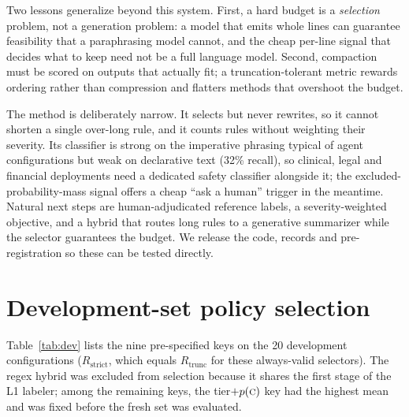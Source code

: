 \documentclass[11pt,a4paper]{article}
\newcommand{\Rt}{R_{\mathrm{trunc}}}
\newcommand{\Rs}{R_{\mathrm{strict}}}
\begin{document}
Two lessons generalize beyond this system. First, a hard budget is a \emph{selection} problem, not a generation problem: a model that emits whole lines can guarantee feasibility that a paraphrasing model cannot, and the cheap per-line signal that decides what to keep need not be a full language model. Second, compaction must be scored on outputs that actually fit; a truncation-tolerant metric rewards ordering rather than compression and flatters methods that overshoot the budget.

The method is deliberately narrow. It selects but never rewrites, so it cannot shorten a single over-long rule, and it counts rules without weighting their severity. Its classifier is strong on the imperative phrasing typical of agent configurations but weak on declarative text (32\% recall), so clinical, legal and financial deployments need a dedicated safety classifier alongside it; the excluded-probability-mass signal offers a cheap ``ask a human'' trigger in the meantime. Natural next steps are human-adjudicated reference labels, a severity-weighted objective, and a hybrid that routes long rules to a generative summarizer while the selector guarantees the budget. We release the code, records and pre-registration so these can be tested directly.




\appendix
\clearpage
\section{Development-set policy selection}\label{app:dev}
Table~\ref{tab:dev} lists the nine pre-specified keys on the 20 development configurations ($\Rs$, which equals $\Rt$ for these always-valid selectors). The regex hybrid was excluded from selection because it shares the first stage of the L1 labeler; among the remaining keys, the tier$+p(\textsc{c})$ key had the highest mean and was fixed before the fresh set was evaluated.
\end{document}
